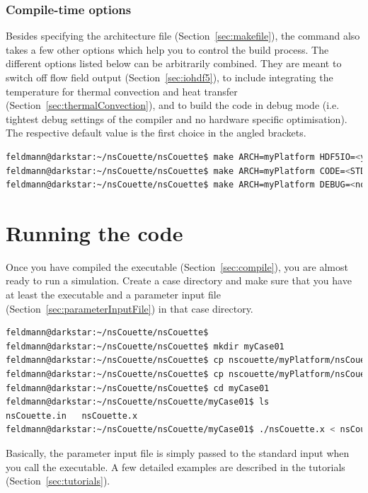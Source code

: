 \documentclass[a4paper, 11pt, DIV=11]{scrartcl}
\begin{document}
\subsubsection{Compile-time options}
\label{sec:compileTimeOptions}

Besides specifying the architecture file (Section~\ref{sec:makefile}),
the  command also takes a few other options which help you to
control the build process. The different options listed below can be
arbitrarily combined. They are meant to switch off \hdf flow field output
(Section~\ref{sec:iohdf5}), to include integrating the temperature for
thermal convection and heat transfer (Section~\ref{sec:thermalConvection}),
and to build the code in debug mode (i.e. tightest debug settings of the
compiler and no hardware specific optimisation). The respective default
value is the first choice in the angled brackets.
\begin{lstlisting}[language=bash]
feldmann@darkstar:~/nsCouette/nsCouette$ make ARCH=myPlatform HDF5IO=<yes|no>
feldmann@darkstar:~/nsCouette/nsCouette$ make ARCH=myPlatform CODE=<STD_CODE|TE_CODE>
feldmann@darkstar:~/nsCouette/nsCouette$ make ARCH=myPlatform DEBUG=<no|yes>
\end{lstlisting}



\section{Running the code}
\label{sec:runningTheCode}

Once you have compiled the executable (Section~\ref{sec:compile}), you
are almost ready to run a simulation. Create a case directory and make
sure that you have at least the executable and a parameter input file 
(Section~\ref{sec:parameterInputFile}) in that case directory.
\begin{lstlisting}[language=bash]
feldmann@darkstar:~/nsCouette/nsCouette$
feldmann@darkstar:~/nsCouette/nsCouette$ mkdir myCase01
feldmann@darkstar:~/nsCouette/nsCouette$ cp nscouette/myPlatform/nsCouette.x  myCase01/.
feldmann@darkstar:~/nsCouette/nsCouette$ cp nscouette/myPlatform/nsCouette.in myCase01/.
feldmann@darkstar:~/nsCouette/nsCouette$ cd myCase01
feldmann@darkstar:~/nsCouette/nsCouette/myCase01$ ls
nsCouette.in   nsCouette.x
feldmann@darkstar:~/nsCouette/nsCouette/myCase01$ ./nsCouette.x < nsCouette.in
\end{lstlisting}
Basically, the parameter input file is simply passed to the standard input
when you call the executable. A few detailed examples are described in the
tutorials (Section~\ref{sec:tutorials}).
\end{document}

